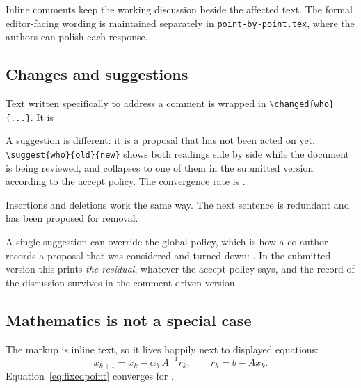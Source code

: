 Inline comments keep the working discussion beside the affected text. The
formal editor-facing wording is maintained separately in
\texttt{point-by-point.tex}, where the authors can polish each response.

\subsection{Changes and suggestions}

Text written specifically to address a comment is wrapped in
\verb|\changed{who}{...}|. It is

A suggestion is different: it is a proposal that has not been acted on yet.
\verb|\suggest{who}{old}{new}| shows both readings side by side while the
document is being reviewed, and collapses to one of them in the submitted
version according to the accept policy. The convergence rate is
.

Insertions and deletions work the same way.
The next sentence is redundant and has been proposed for removal.

A single suggestion can override the global policy, which is how a co-author
records a proposal that was considered and turned down:
. In the submitted version this
prints \emph{the residual}, whatever the accept policy says, and the record of
the discussion survives in the comment-driven version.

\subsection{Mathematics is not a special case}

The markup is inline text, so it lives happily next to displayed equations:
\begin{equation}
  \label{eq:fixedpoint}
  x_{k+1} = x_k - \alpha_k \, A^{-1} r_k ,
  \qquad r_k = b - A x_k .
\end{equation}
Equation~\eqref{eq:fixedpoint} converges for
.%

